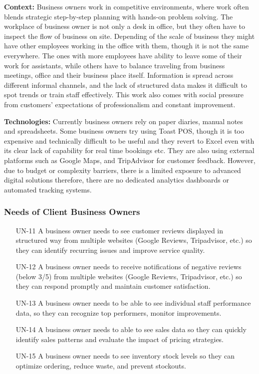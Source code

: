 \documentclass[]{VUMIFTemplateClass}
\newcommand{\noticecomment}[1]{%
    \begin{tcolorbox}[colback=blue!20, colframe=blue!60, arc=0pt, outer arc=0pt, boxrule=1pt, left=3pt, right=3pt, top=3pt, bottom=3pt]
        \textbf{\textcolor{blue!70!black}{NOTE:}} #1
    \end{tcolorbox}
}
\begin{document}
    \textbf{Context:} Business owners work in competitive environments, where work often blends strategic step-by-step planning with hands-on problem solving. The workplace of business owner is not only a desk in office, but they often have to inspect the flow of business on site. Depending of the scale of business they might have other employees working in the office with them, though it is not the same everywhere. The ones with more employees have ability to leave some of their work for assistants, while others have to balance traveling from business meetings, office and their business place itself. 
Information is spread across different informal channels, and the lack of
structured data makes it difficult to spot trends or train staff
effectively. This work also comes with social pressure from customers'
expectations of professionalism and constant improvement.

    \textbf{Technologies:} Currently business owners rely on paper diaries,
manual notes and spreadsheets. Some business owners try using Toast POS, though it is too expensive and technically difficult to be useful and they revert to Excel even with its clear lack of capability for real time bookings etc. They are also using external platforms such as
Google Maps, and TripAdvisor for customer feedback. However, due to budget
or complexity barriers, there is a limited exposure to advanced digital
solutions therefore, there are no dedicated analytics dashboards or
automated tracking systems.

\subsubsection{Needs of Client Business Owners}
\begin{itemize}
    \item[UN-11]\label{UN-11} A business owner needs to see customer reviews displayed in structured way from multiple websites (Google Reviews, Tripadvisor, etc.) so they can identify recurring issues and improve service quality.
    \item[UN-12]\label{UN-12} A business owner needs to receive notifications of negative reviews (below 3/5) from multiple websites (Google Reviews, Tripadvisor, etc.) so they can respond promptly and maintain customer satisfaction.
    \item[UN-13]\label{UN-13} A business owner needs to be able to see individual staff performance data, so they can recognize top performers, monitor improvements.
    \item[UN-14]\label{UN-14} A business owner needs to able to see sales data so they can quickly identify sales patterns and evaluate the impact of pricing strategies. 
    \item[UN-15]\label{UN-15} A business owner needs to see inventory stock levels so they can optimize ordering, reduce waste, and prevent stockouts.

\end{itemize}
\end{document}
